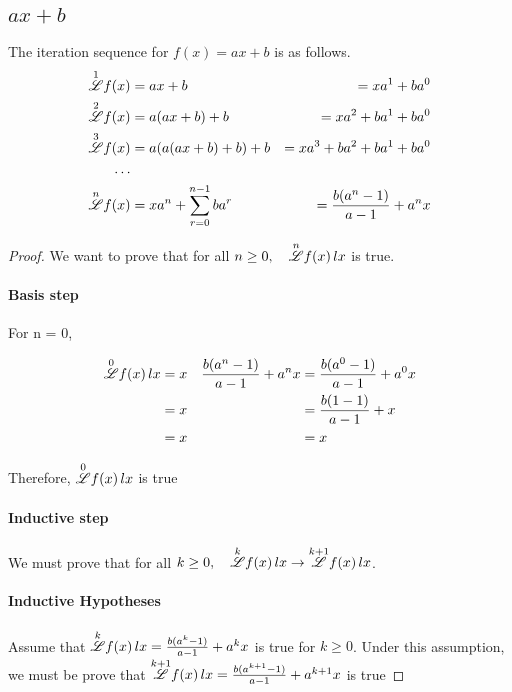 \documentclass[12pt, letterpaper]{article}
\begin{document}
\subsection{$ax+b$}
The iteration sequence for {$f(x) = ax+b$} is as follows.
\begin{align*}
    \overset{1}{\mathscr{L}} f(x) &= ax + b               &= xa^{1}+ba^{0} \\ 
    \overset{2}{\mathscr{L}} f(x) &= a(ax + b) + b        &= xa^{2}+ba^{1}+ba^{0} \\
    \overset{3}{\mathscr{L}} f(x) &= a(a(ax + b) + b) + b &= xa^{3} + ba^{2} + ba^{1} + ba^{0} \\
       \dots \\
    \overset{n}{\mathscr{L}} f(x) &= xa^{n}+\sum_{r=0}^{n-1} ba^{r}  &= \frac{b(a^{n}-1)}{a-1}+a^{n}x
\end{align*}
\begin{proof}
    We want to prove that for all $n \ge 0, \quad \overset{n}{\mathscr{L}} f(x) \, lx$  is true.

    \paragraph{Basis step}
    For n = 0, 
    
    \begin{align*}
        \overset{0}{\mathscr{L}} f(x) \, lx &= x
        &\frac{b(a^n - 1)}{a-1} + a^n x &= \frac{b (a^0-1)}{a-1} + a^0 x \\
        &= x &&= \frac{b (1-1)}{a-1} + x \\
        &= x &&= x
    \end{align*}
        
    Therefore, $\overset{0}{\mathscr{L}} f(x) \, lx$ is true

    \paragraph{Inductive step}

    We must prove that for all $k \ge 0, \quad \overset{k}{\mathscr{L}} f(x) \, lx \to \overset{k+1}{\mathscr{L}} f(x) \, lx$.

    \paragraph{Inductive Hypotheses}
    Assume that $\overset{k}{\mathscr{L}} f(x) \, lx = \frac{b(a^k - 1)}{a-1} + a^k x$ is true for $k \ge 0$.
    Under this assumption, we must be prove that $\overset{k+1}{\mathscr{L}} f(x) \, lx = \frac{b(a^{k+1} - 1)}{a-1} + a^{k+1} x$ is true


\end{proof}
\end{document}
